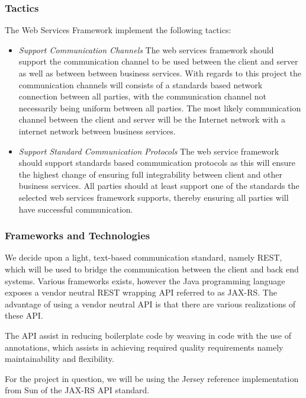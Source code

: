\subsubsection{Tactics}
The Web Services Framework implement the following tactics:
\begin{itemize}
\item \textit{Support Communication Channels}
The web services framework should support the communication channel to be used
between the client and server as well as between between business services.
With regards to this project the communication channels will consists of a
standards based network connection between all parties, with the communication
channel not necessarily being uniform between all parties. The most likely
communication channel between the client and server will be the Internet
network with a internet network between business services.

\item \textit{Support Standard Communication Protocols}
The web service framework should support standards based communication
protocols as this will ensure the highest change of ensuring full
integrability between client and other business services. All parties should
at least support one of the standards the selected web services framework
supports, thereby ensuring all parties will have successful communication.
\end{itemize}


\subsubsection{Frameworks and Technologies}
We decide upon a light, text-based communication standard, namely REST, which
will be used to bridge the communication between the client and back end systems.
Various frameworks exists, however the Java programming language exposes a
vendor neutral REST wrapping API referred to as JAX-RS. The advantage of using a
vendor neutral API is that there are various realizations of these API.

The API assist in reducing boilerplate code by weaving in code with the use of
annotations, which assists in achieving required quality requirements namely
maintainability and flexibility.

For the project in question, we will be using the Jersey reference implementation
from Sun of the JAX-RS API standard.
